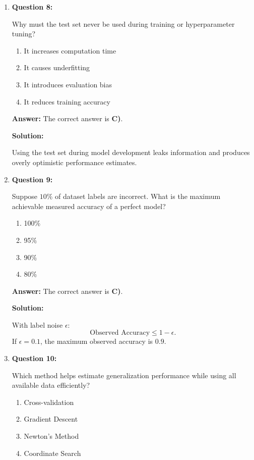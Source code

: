 \documentclass{article}
\begin{document}
\begin{enumerate}
\item \textbf{Question 8:}

Why must the test set never be used during training or hyperparameter tuning?

\begin{enumerate}
    \item It increases computation time
    \item It causes underfitting
    \item It introduces evaluation bias
    \item It reduces training accuracy
\end{enumerate}

\textbf{Answer:} The correct answer is \textbf{C)}.

\textbf{Solution:}

Using the test set during model development leaks information and produces overly optimistic performance estimates.

\vspace{6pt}

\item \textbf{Question 9:}

Suppose $10\%$ of dataset labels are incorrect. What is the maximum achievable measured accuracy of a perfect model?

\begin{enumerate}
    \item 100\%
    \item 95\%
    \item 90\%
    \item 80\%
\end{enumerate}

\textbf{Answer:} The correct answer is \textbf{C)}.

\textbf{Solution:}

With label noise $\epsilon$:
\[
\text{Observed Accuracy} \le 1-\epsilon.
\]
If $\epsilon=0.1$, the maximum observed accuracy is $0.9$.

\vspace{6pt}

\item \textbf{Question 10:}

Which method helps estimate generalization performance while using all available data efficiently?

\begin{enumerate}
    \item Cross-validation
    \item Gradient Descent
    \item Newton’s Method
    \item Coordinate Search
\end{enumerate}


\end{enumerate}
\end{document}

